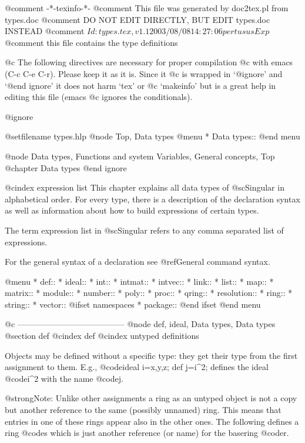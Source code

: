 @comment -*-texinfo-*-
@comment This file was generated by doc2tex.pl from types.doc
@comment DO NOT EDIT DIRECTLY, BUT EDIT types.doc INSTEAD
@comment $Id: types.tex,v 1.1 2003/08/08 14:27:06 pertusus Exp $
@comment this file contains the type definitions

@c The following directives are necessary for proper compilation
@c with emacs (C-c C-e C-r).  Please keep it as it is.  Since it
@c is wrapped in `@ignore' and `@end ignore' it does not harm `tex' or
@c `makeinfo' but is a great help in editing this file (emacs
@c ignores the conditionals).

@ignore

@setfilename types.hlp
@node Top, Data types
@menu
* Data types::
@end menu

@node Data types, Functions and system Variables, General concepts, Top
@chapter Data types
@end ignore

@cindex expression list
This chapter explains all data types of @sc{Singular} in
alphabetical order. For every type, there is a description of the
declaration syntax as well as information about how to build expressions
of certain types.

The term expression list in @sc{Singular} refers to any comma separated
list of expressions.

For the general syntax of a declaration see @ref{General command syntax}.

@menu
* def::
* ideal::
* int::
* intmat::
* intvec::
* link::
* list::
* map::
* matrix::
* module::
* number::
* poly::
* proc::
* qring::
* resolution::
* ring::
* string::
* vector::
@ifset namespaces
* package::
@end ifset
@end menu

@c ---------------------------------------
@node def, ideal, Data types, Data types
@section def
@cindex def
@cindex untyped definitions

Objects may be defined without a specific type: they get their
type from the first assignment to them.
E.g., @code{ideal i=x,y,z; def j=i^2;} defines the ideal @code{i^2}
with the name @code{j}.

@strong{Note:} Unlike other assignments a ring as an untyped object
is not a copy but another reference to the same (possibly unnamed) ring.
This means that entries in one of these rings appear also in the other ones.
The following defines a ring @code{s} which is just another reference (or name)
for the basering @code{r}.

